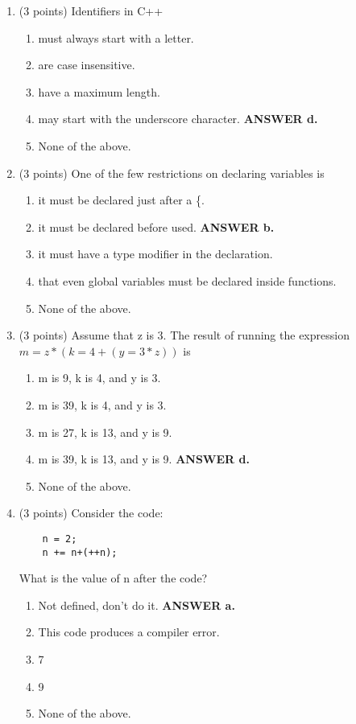 \documentclass{article}
\newcommand{\ans}[1]{ \ifnum\showans=1 {\bf ANSWER #1.} \fi }
\begin{document}
\begin{enumerate}
\item (3 points) Identifiers in C++ 
  \begin{enumerate}
  \item must always start with a letter.
  \item are case insensitive.
  \item have a maximum length.
  \item may start with the underscore character.  \ans{d}
  \item None of the above.
  \end{enumerate}

\item (3 points) One of the few restrictions on declaring variables is
  \begin{enumerate}
  \item it must be declared just after a \{.
  \item it must be declared before used.  \ans{b}
  \item it must have a type modifier in the declaration.
  \item that even global variables must be declared inside functions.
  \item None of the above.
  \end{enumerate}

\item (3 points) Assume that z is 3.  The result of running the
expression $m = z * (k = 4 + (y = 3 * z))$ is
  \begin{enumerate}
  \item m is 9, k is 4, and y is 3.
  \item m is 39, k is 4, and y is 3.
  \item m is 27, k is 13, and y is 9.
  \item m is 39, k is 13, and y is 9.  \ans{d}
  \item None of the above.
  \end{enumerate}

\item (3 points) Consider the code:
\begin{verbatim}
    n = 2;
    n += n+(++n);
\end{verbatim}
What is the value of n after the code?
  \begin{enumerate}
  \item Not defined, don't do it.  \ans{a}
  \item This code produces a compiler error.
  \item 7
  \item 9
  \item None of the above.
  \end{enumerate}


\end{enumerate}
\end{document}
